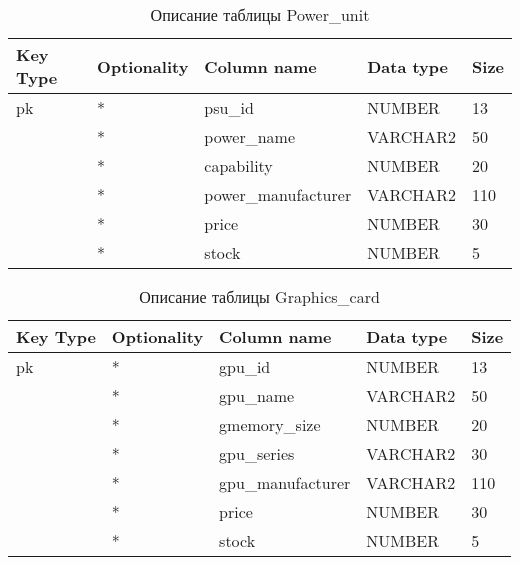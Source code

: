\newpage

\begin{xltabular}{\textwidth}{|X|X|p{4.0cm}|X|X|}
	\caption{Описание таблицы Power\_unit\label{tab:psu}}\\
	\hline
	Key Type & Optionality & Column name & Data type & Size \\ \hline
	pk & * & psu\_id & NUMBER & 13 \\ \hline
	& * & power\_name & VARCHAR2 & 50 \\ \hline
	& * & capability & NUMBER & 20 \\ \hline
	& * & power\_manufacturer & VARCHAR2 & 110 \\ \hline
	& * & price & NUMBER & 30 \\ \hline
	& * & stock & NUMBER & 5 \\ \hline
\end{xltabular}

\begin{xltabular}{\textwidth}{|X|X|p{4.0cm}|X|X|}
	\caption{Описание таблицы Graphics\_card\label{tab:gpu}}\\
	\hline
	Key Type & Optionality & Column name & Data type & Size \\ \hline
	pk & * & gpu\_id & NUMBER & 13 \\ \hline
	& * & gpu\_name & VARCHAR2 & 50 \\ \hline
	& * & gmemory\_size & NUMBER & 20 \\ \hline
	& * & gpu\_series & VARCHAR2 & 30 \\ \hline
	& * & gpu\_manufacturer & VARCHAR2 & 110 \\ \hline
	& * & price & NUMBER & 30 \\ \hline
	& * & stock & NUMBER & 5 \\ \hline
\end{xltabular}

